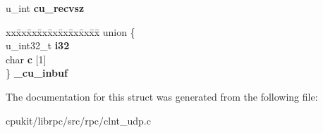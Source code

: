\begin{DoxyCompactItemize}
\begin{tabbing}
\end{tabbing}\item 
\mbox{\label{structcu__data_a49375259517bf9fdd72e2ea7df389ad1}} 
u\+\_\+int {\bfseries cu\+\_\+recvsz}
\item 
\mbox{\label{structcu__data_aea0c8febcb020d6ed4ba38617948483e}} 
\begin{tabbing}
xx\=xx\=xx\=xx\=xx\=xx\=xx\=xx\=xx\=\kill
union \{\\
\>u\_int32\_t {\bfseries i32}\\
\>char {\bfseries c} \mbox{[}1\mbox{]}\\
\} {\bfseries \_cu\_inbuf}\\

\end{tabbing}\end{DoxyCompactItemize}


The documentation for this struct was generated from the following file\+:\begin{DoxyCompactItemize}
\item 
cpukit/librpc/src/rpc/clnt\+\_\+udp.\+c\end{DoxyCompactItemize}
